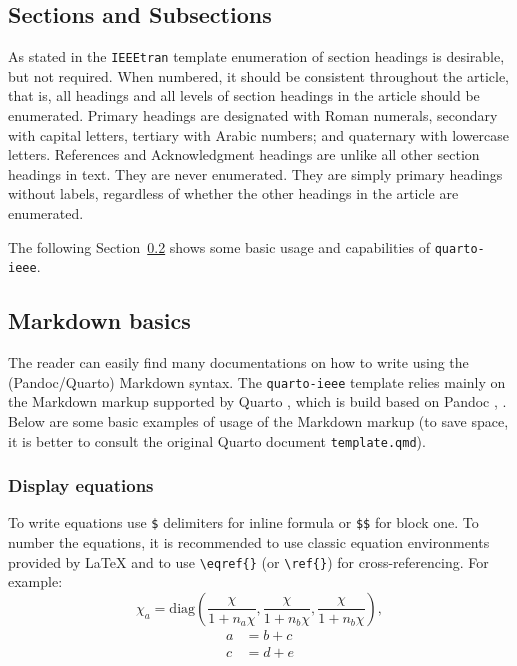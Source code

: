 \documentclass[
  journal,
]{IEEEtran}%
\theoremstyle{plain}
\theoremstyle{remark}
\begin{document}
\subsection{Sections and Subsections}\label{sections-and-subsections}

As stated in the \texttt{IEEEtran} template enumeration of section
headings is desirable, but not required. When numbered, it should be
consistent throughout the article, that is, all headings and all levels
of section headings in the article should be enumerated. Primary
headings are designated with Roman numerals, secondary with capital
letters, tertiary with Arabic numbers; and quaternary with lowercase
letters. References and Acknowledgment headings are unlike all other
section headings in text. They are never enumerated. They are simply
primary headings without labels, regardless of whether the other
headings in the article are enumerated.

The following Section~\ref{sec-Markdown} shows some basic usage and
capabilities of \texttt{quarto-ieee}.

\subsection{Markdown basics}\label{sec-Markdown}

The reader can easily find many documentations on how to write using the
(Pandoc/Quarto) Markdown syntax. The \texttt{quarto-ieee} template
relies mainly on the Markdown markup supported by Quarto
, which is build based on Pandoc
,
. Below are some basic
examples of usage of the Markdown markup (to save space, it is better to
consult the original Quarto document \texttt{template.qmd}).

\subsubsection{Display equations}\label{display-equations}

To write equations use \texttt{\$} delimiters for inline formula or
\texttt{\$\$} for block one. To number the equations, it is recommended
to use classic equation environments provided by {\LaTeX} and to use
\texttt{\textbackslash{}eqref\{\}} (or \texttt{\textbackslash{}ref\{\}})
for cross-referencing. For example: \begin{equation}\label{eq:1}
{{\chi}_a}=\text{diag}\left(\frac{{\chi}}{1+n_a{\chi}},\frac{{\chi}}{1+n_b{\chi}},\frac{{\chi}}{1+n_b{\chi}}\right),
\end{equation} \begin{align}
a & = b + c \label{eq:2} \\
c & = d + e \label{eq:3}
\end{align}
\end{document}
